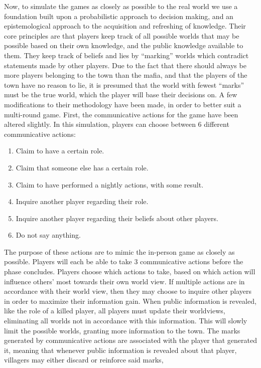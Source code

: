 Now, to simulate the games as closely as possible to the real world we use a 
foundation built upon a probabilistic approach to decision making, and an 
epistemological approach to the acquisition and refreshing of 
knowledge\cite{commitment}.
Their core principles are that players keep track of all possible worlds that
may be possible based on their own knowledge, and the public knowledge
available to them. They keep track of beliefs and lies by “marking” worlds
which contradict statements made by other players. Due to the fact that there
should always be more players belonging to the town than the mafia, and that
the players of the town have no reason to lie, it is presumed that the world
with fewest “marks” must be the true world, which the player will base their
decisions on. A few modifications to their methodology have been made, in order
to better suit a multi-round game. First, the communicative actions for the
game have been altered slightly. In this simulation, players can choose between
6 different communicative actions:
\begin{enumerate}
    \item Claim to have a certain role.
    \item Claim that someone else has a certain role.
    \item Claim to have performed a nightly actions, with some result.
    \item Inquire another player regarding their role.
    \item Inquire another player regarding their beliefs about other players.
    \item Do not say anything.
\end{enumerate}
The purpose of these actions are to mimic the in-person game as closely as
possible. Players will each be able to take 3 communicative actions before the
phase concludes. Players choose which actions to take, based on which action
will influence others’ most towards their own world view. If multiple actions
are in accordance with their world view, then they may choose to inquire other
players in order to maximize their information gain. When public information is
revealed, like the role of a killed player, all players must update their
worldviews, eliminating all worlds not in accordance with this information.
This will slowly limit the possible worlds, granting more information to the
town. The marks generated by communicative actions are associated with the
player that generated it, meaning that whenever public information is revealed
about that player, villagers may either discard or reinforce said marks,
